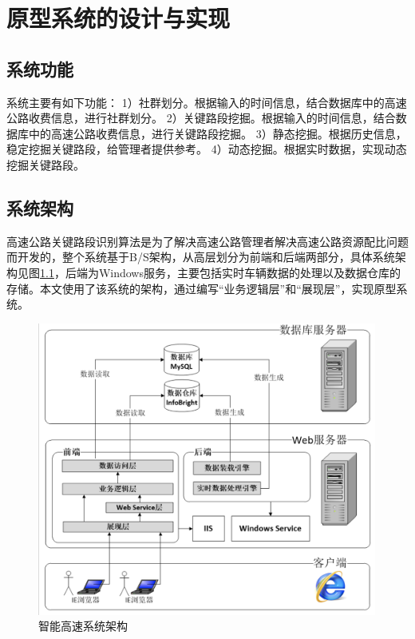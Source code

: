 
\chapter{原型系统的设计与实现}
	\section{系统功能}
		系统主要有如下功能：
		1）社群划分。根据输入的时间信息，结合数据库中的高速公路收费信息，进行社群划分。
		2）关键路段挖掘。根据输入的时间信息，结合数据库中的高速公路收费信息，进行关键路段挖掘。
		3）静态挖掘。根据历史信息，稳定挖掘关键路段，给管理者提供参考。
		4）动态挖掘。根据实时数据，实现动态挖掘关键路段。

	\section{系统架构}
		高速公路关键路段识别算法是为了解决高速公路管理者解决高速公路资源配比问题而开发的，整个系统基于B/S架构，从高层划分为前端和后端两部分，具体系统架构见图\ref{fig20}，后端为Windows服务，主要包括实时车辆数据的处理以及数据仓库的存储。本文使用了该系统的架构，通过编写“业务逻辑层”和“展现层”，实现原型系统。
		\begin{figure}[h]
		\centering
				\begin{minipage}{0.8\linewidth}
					\centering
					\includegraphics[width=4.4in]{picture/jiagou}
					\caption{智能高速系统架构}
					\label{fig20}
				\end{minipage}%
		\end{figure}
		
